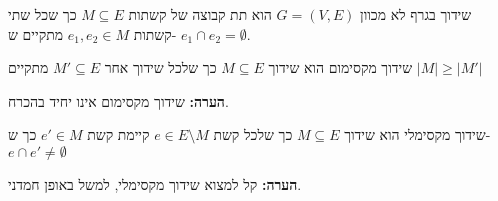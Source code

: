 \begin{definition}[שידוך]
שידוך בגרף לא מכוון
$G = (V, E)$
הוא תת קבוצה של קשתות 
$M \subseteq E$
כך שכל שתי קשתות
$e_1, e_2 \in M$
מתקיים ש-
$e_1 \cap e_2 = \emptyset$.
\end{definition}

\begin{definition}
שידוך מקסימום הוא שידוך 
$M \subseteq E$
כך שלכל שידוך אחר
$M' \subseteq E$
מתקיים
$|M| \geq |M'|$
\end{definition}

\textbf{הערה:}
שידוך מקסימום אינו יחיד בהכרח.

\begin{definition}
שידוך מקסימלי הוא שידוך 
$M \subseteq E$
כך שלכל קשת 
$e \in E \setminus M$
קיימת קשת 
$e' \in M$
כך ש-
$e \cap e' \neq \emptyset$
\end{definition}

\textbf{הערה:}
קל למצוא שידוך מקסימלי, למשל באופן חמדני.

